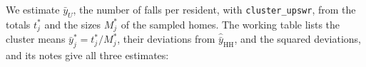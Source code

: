 \documentclass[
  letterpaper,
  DIV=11,
  numbers=noendperiod]{scrreprt}
\newenvironment{Shaded}{\begin{snugshade}}{\end{snugshade}}
\newcommand{\AttributeTok}[1]{\textcolor[rgb]{0.40,0.45,0.13}{#1}}
\newcommand{\FunctionTok}[1]{\textcolor[rgb]{0.28,0.35,0.67}{#1}}
\newcommand{\NormalTok}[1]{\textcolor[rgb]{0.00,0.23,0.31}{#1}}
\newcommand{\OtherTok}[1]{\textcolor[rgb]{0.00,0.23,0.31}{#1}}
\newcommand{\SpecialCharTok}[1]{\textcolor[rgb]{0.37,0.37,0.37}{#1}}
\newcommand{\StringTok}[1]{\textcolor[rgb]{0.13,0.47,0.30}{#1}}
\renewcommand{\[}{\begin{equation}}
\renewcommand{\]}{\end{equation}}
\begin{document}
We estimate \(\bar{y}_U\), the number of falls per resident, with
\texttt{cluster\_upswr}, from the totals \(t_j^*\) and the sizes
\(M_j^*\) of the sampled homes. The working table lists the cluster
means \(\bar{y}_j^*=t_j^*/M_j^*\), their deviations from
\(\hat{\bar{y}}_{\mathrm{HH}}\), and the squared deviations, and its
notes give all three estimates:

\begin{Shaded}
\end{Shaded}
\end{document}
